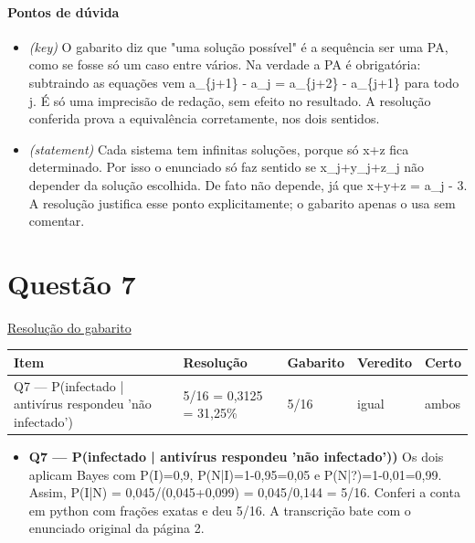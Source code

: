 \documentclass{article}%
\begin{document}
\paragraph{Pontos de dúvida}%
\begin{itemize}%
\item%
\textit{(key)} O gabarito diz que "uma solução possível" é a sequência ser uma PA, como se fosse só um caso entre vários. Na verdade a PA é obrigatória: subtraindo as equações vem a\_\{j+1\} - a\_j = a\_\{j+2\} - a\_\{j+1\} para todo j. É só uma imprecisão de redação, sem efeito no resultado. A resolução conferida prova a equivalência corretamente, nos dois sentidos.%
\item%
\textit{(statement)} Cada sistema tem infinitas soluções, porque só x+z fica determinado. Por isso o enunciado só faz sentido se x\_j+y\_j+z\_j não depender da solução escolhida. De fato não depende, já que x+y+z = a\_j - 3. A resolução justifica esse ponto explicitamente; o gabarito apenas o usa sem comentar.%
\end{itemize}%
\section*{Questão 7}%
\href{https://poliedroresolve.sistemapoliedro.com.br/vestibulares/ime/2026/ime-2-fase-dia-1-23-10-2025-2-fase-dia-1/dissertativa-7-matematica-2-fase-dia-1-ime-2026}{Resolução do gabarito}\par\smallskip%
\begin{longtable}{@{}p{} p{} p{} p{} p{}@{}}\toprule Item & Resolução & Gabarito & Veredito & Certo \\ \midrule
Q7 --- P(infectado | antivírus respondeu 'não infectado') & 5/16 = 0,3125 = 31,25\% & 5/16 & igual & ambos \\
\bottomrule\end{longtable}%
\begin{itemize}%
\item%
\textbf{Q7 --- P(infectado | antivírus respondeu 'não infectado'))} Os dois aplicam Bayes com P(I)=0,9, P(N|I)=1-0,95=0,05 e P(N|?)=1-0,01=0,99. Assim, P(I|N) = 0,045/(0,045+0,099) = 0,045/0,144 = 5/16. Conferi a conta em python com frações exatas e deu 5/16. A transcrição bate com o enunciado original da página 2.%
\end{itemize}%
\end{document}
